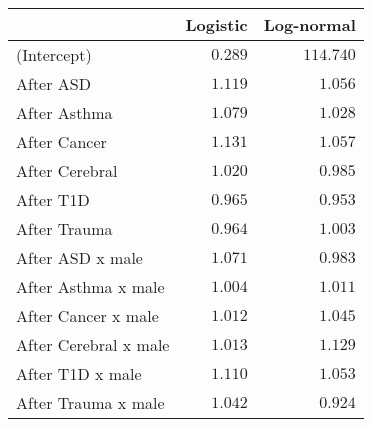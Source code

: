 \begin{table}[!tbp]
\begin{center}
\begin{tabular}{lrr}
\hline\hline
\multicolumn{1}{l}{}&\multicolumn{1}{c}{Logistic}&\multicolumn{1}{c}{Log-normal}\tabularnewline
\hline
(Intercept)&$0.289$&$114.740$\tabularnewline
After ASD&$1.119$&$  1.056$\tabularnewline
After Asthma&$1.079$&$  1.028$\tabularnewline
After Cancer&$1.131$&$  1.057$\tabularnewline
After Cerebral&$1.020$&$  0.985$\tabularnewline
After T1D&$0.965$&$  0.953$\tabularnewline
After Trauma&$0.964$&$  1.003$\tabularnewline
After ASD x male&$1.071$&$  0.983$\tabularnewline
After Asthma x male&$1.004$&$  1.011$\tabularnewline
After Cancer x male&$1.012$&$  1.045$\tabularnewline
After Cerebral  x male&$1.013$&$  1.129$\tabularnewline
After T1D x male&$1.110$&$  1.053$\tabularnewline
After Trauma x male&$1.042$&$  0.924$\tabularnewline
\hline
\end{tabular}\end{center}
\end{table}
